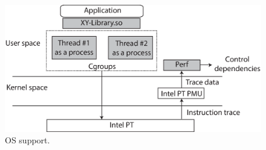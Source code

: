 
\begin{figure}[t]

\centering
      \includegraphics[scale=.35]{figure/PT-os}
  \caption{\projecttitle OS support.}
   
  \label{fig:pt-OS-support}

\end{figure}
